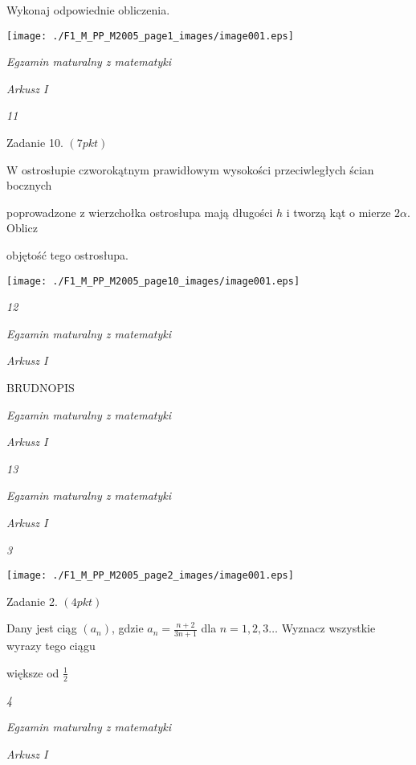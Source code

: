 \documentclass[a4paper,12pt]{article}
\begin{document}
Wykonaj odpowiednie obliczenia.
\begin{center}
\texttt{[image: ./F1\_M\_PP\_M2005\_page1\_images/image001.eps]}
\end{center}




{\it Egzamin maturalny z matematyki}

{\it Arkusz I}

{\it 11}

Zadanie 10. $(7pkt)$

$\mathrm{W}$ ostrosłupie czworokątnym prawidłowym wysokości przeciwległych ścian bocznych

poprowadzone z wierzchołka ostrosłupa mają długości $h$ i tworzą kąt o mierze $ 2\alpha$. Oblicz

objętość tego ostrosłupa.
\begin{center}
\texttt{[image: ./F1\_M\_PP\_M2005\_page10\_images/image001.eps]}
\end{center}




{\it 12}

{\it Egzamin maturalny z matematyki}

{\it Arkusz I}

BRUDNOPIS





{\it Egzamin maturalny z matematyki}

{\it Arkusz I}

{\it 13}





{\it Egzamin maturalny z matematyki}

{\it Arkusz I}

{\it 3}
\begin{center}
\texttt{[image: ./F1\_M\_PP\_M2005\_page2\_images/image001.eps]}
\end{center}
Zadanie 2. $(4pkt)$

Dany jest ciąg $(a_{n})$, gdzie $a_{n}=\displaystyle \frac{n+2}{3n+1}$ dla $ n=1,2,3\ldots$ Wyznacz wszystkie wyrazy tego ciągu

większe od $\displaystyle \frac{1}{2}$





{\it 4}

{\it Egzamin maturalny z matematyki}

{\it Arkusz I}
\end{document}
